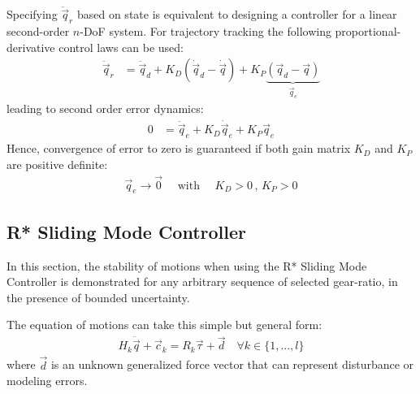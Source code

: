 Specifying $\ddot{\vec{q}}_r$ based on state is equivalent to designing a controller for a linear second-order $n$-DoF system. For trajectory tracking the following proportional-derivative control laws can be used:
\begin{align}
\ddot{\vec{q}}_r &= \ddot{\vec{q}}_d + K_D ( \dot{\vec{q}}_d - \dot{\vec{q}} ) + K_P \underbrace{( \vec{q}_d - \vec{q} ) }_{\vec{q}_e}
\end{align}
leading to second order error dynamics:
\begin{align}
0 &= \ddot{\vec{q}}_e + K_D \dot{\vec{q}}_e + K_P \vec{q}_e
\end{align}
Hence, convergence of error to zero is guaranteed if both gain matrix $K_D$ and $K_P$ are positive definite:
\begin{align}
\vec{q}_e \rightarrow \vec{0} \quad\text{ with }\quad K_D > 0 \, , \, K_P > 0
\end{align}



\newpage

\subsection{R* Sliding Mode Controller}
\label{sec:stabrstar2}

In this section, the stability of motions when using the R* Sliding Mode Controller is demonstrated for any arbitrary sequence of selected gear-ratio, in the presence of bounded uncertainty.

The equation of motions can take this simple but general form:
\begin{align}
H_k \ddot{\vec{q}} + \vec{c}_k = R_k \vec{\tau} + \vec{d} \quad \forall k \in \{1,...,l\}
\label{eq:eom_kd}
\end{align}
where $\vec{d}$ is an unknown generalized force vector that can represent disturbance or modeling errors.

